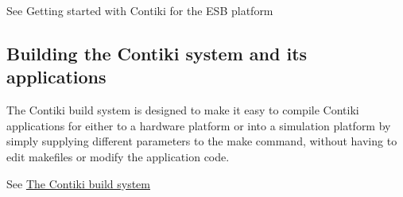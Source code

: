 See Getting started with Contiki for the E\+SB platform \hypertarget{index_contiki-mainpage-building}{}\subsection{Building the Contiki system and its applications}\label{index_contiki-mainpage-building}
The Contiki build system is designed to make it easy to compile Contiki applications for either to a hardware platform or into a simulation platform by simply supplying different parameters to the {\ttfamily make} command, without having to edit makefiles or modify the application code.

See \hyperlink{a00058}{The Contiki build system} 